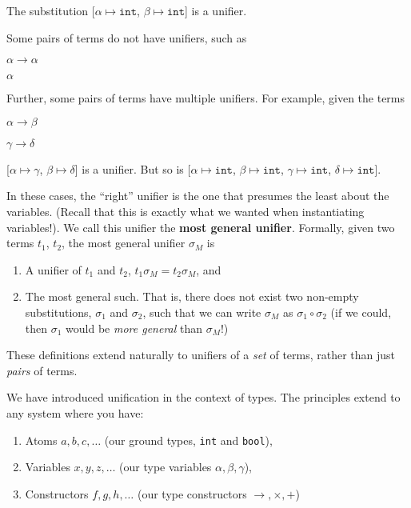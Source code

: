 {The substitution [$\alpha \mapsto \texttt{int}$, $\beta \mapsto \texttt{int}$] is a unifier.

Some pairs of terms do not have unifiers, such as
\begin{minipage}[t]{0.5\textwidth}
\centering
$\alpha \to \alpha$
\end{minipage}%
\begin{minipage}[t]{0.5\textwidth}
\centering
$\alpha$
\end{minipage}

Further, some pairs of terms have multiple unifiers. For example, given the terms

\begin{minipage}[t]{0.5\textwidth}
\centering
$\alpha \to \beta$
\end{minipage}%
\begin{minipage}[t]{0.5\textwidth}
\centering
$\gamma \to \delta$
\end{minipage}

[$\alpha \mapsto \gamma$, $\beta \mapsto \delta$] is a unifier. But so is [$\alpha \mapsto \texttt{int}$, $\beta \mapsto \texttt{int}$, $\gamma \mapsto \texttt{int}$, $\delta \mapsto \texttt{int}$].

In these cases, the ``right'' unifier is the one that presumes the least about the variables. (Recall that this is exactly what we wanted when instantiating variables!). We call this unifier the \textbf{most general unifier}. Formally, given two terms $t_1$, $t_2$, the most general unifier $\sigma_M$ is
\begin{enumerate}
    \item A unifier of $t_1$ and $t_2$, $t_1 \sigma_M = t_2 \sigma_M$, and
    \item The most general such. That is, there does not exist two non-empty substitutions, $\sigma_1$ and $\sigma_2$, such that we can write $\sigma_M$ as $\sigma_1 \circ \sigma_2$ (if we could, then $\sigma_1$ would be \textit{more general} than $\sigma_M$!)
\end{enumerate}

These definitions extend naturally to unifiers of a \textit{set} of terms, rather than just \textit{pairs} of terms.

We have introduced unification in the context of types. The principles extend to any system where you have:

\begin{enumerate}
    \item Atoms $a, b, c, \ldots$ (our ground types, \texttt{int} and \texttt{bool}),
    \item Variables $x, y, z, \ldots$ (our type variables $\alpha, \beta, \gamma$),
    \item Constructors $f, g, h, \ldots$ (our type constructors $\to, \times, +$)
\end{enumerate}

}
